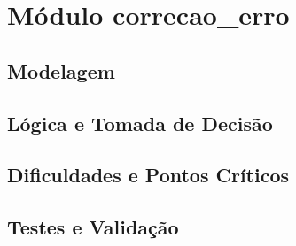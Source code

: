 ﻿%
\section{Módulo correcao_erro}
\subsection{Modelagem}
\subsection{Lógica e Tomada de Decisão}
\subsection{Dificuldades e Pontos Críticos}
\subsection{Testes e Validação}

